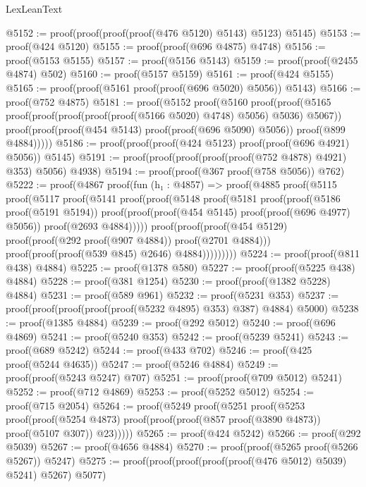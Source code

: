 \begin{lexlean}{LexLeanText}
\begin{coremodule}
@5152 := proof(proof(proof(proof(@476 @5120) @5143) @5123) @5145)
@5153 := proof(@424 @5120)
@5155 := proof(proof(@696 @4875) @4748)
@5156 := proof(@5153 @5155)
@5157 := proof(@5156 @5143)
@5159 := proof(proof(@2455 @4874) @502)
@5160 := proof(@5157 @5159)
@5161 := proof(@424 @5155)
@5165 := proof(proof(@5161 proof(proof(@696 @5020) @5056)) @5143)
@5166 := proof(@752 @4875)
@5181 := proof(@5152
      proof(@5160
          proof(proof(@5165 proof(proof(proof(proof(proof(@5166 @5020) @4748) @5056) @5036) @5067))
              proof(proof(proof(@454 @5143) proof(proof(@696 @5090) @5056)) proof(@899 @4884)))))
@5186 := proof(proof(proof(@424 @5123) proof(proof(@696 @4921) @5056)) @5145)
@5191 := proof(proof(proof(proof(proof(@752 @4878) @4921) @353) @5056) @4938)
@5194 := proof(proof(@367 proof(@758 @5056)) @762)
@5222 := proof(@4867
      proof(fun (h₁ : @4857) =>
        proof(@4885
            proof(@5115
                proof(@5117
                    proof(@5141
                        proof(proof(@5148
                              proof(@5181
                                  proof(proof(@5186 proof(@5191 @5194))
                                      proof(proof(proof(@454 @5145) proof(proof(@696 @4977) @5056))
                                          proof(@2693 @4884)))))
                            proof(proof(proof(@454 @5129)
                                  proof(proof(@292 proof(@907 @4884)) proof(@2701 @4884)))
                                proof(proof(proof(@539 @845) @2646) @4884)))))))))
@5224 := proof(proof(@811 @438) @4884)
@5225 := proof(@1378 @580)
@5227 := proof(proof(@5225 @438) @4884)
@5228 := proof(@381 @1254)
@5230 := proof(proof(@1382 @5228) @4884)
@5231 := proof(@589 @961)
@5232 := proof(@5231 @353)
@5237 := proof(proof(proof(proof(proof(@5232 @4895) @353) @387) @4884) @5000)
@5238 := proof(@1385 @4884)
@5239 := proof(@292 @5012)
@5240 := proof(@696 @4869)
@5241 := proof(@5240 @353)
@5242 := proof(@5239 @5241)
@5243 := proof(@689 @5242)
@5244 := proof(@433 @702)
@5246 := proof(@425 proof(@5244 @4635))
@5247 := proof(@5246 @4884)
@5249 := proof(proof(@5243 @5247) @707)
@5251 := proof(proof(@709 @5012) @5241)
@5252 := proof(@712 @4869)
@5253 := proof(@5252 @5012)
@5254 := proof(@715 @2054)
@5264 := proof(@5249
      proof(@5251
          proof(@5253
              proof(proof(@5254 @4873)
                  proof(proof(proof(@857 proof(@3890 @4873)) proof(@5107 @307)) @23)))))
@5265 := proof(@424 @5242)
@5266 := proof(@292 @5039)
@5267 := proof(@4656 @4884)
@5270 := proof(proof(@5265 proof(@5266 @5267)) @5247)
@5275 := proof(proof(proof(proof(proof(@476 @5012) @5039) @5241) @5267) @5077)

\end{coremodule}
\end{lexlean}
